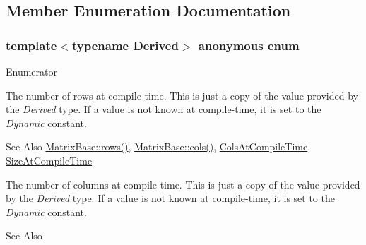 \subsection{Member Enumeration Documentation}
\hypertarget{class_sparse_matrix_base_af601f771c204b3ca254a52085525004c}{\subsubsection[{anonymous enum}]{\setlength{\rightskip}{0pt plus 5cm}template$<$typename Derived$>$ anonymous enum}}\label{class_sparse_matrix_base_af601f771c204b3ca254a52085525004c}
\begin{Desc}
\item[Enumerator]\par
\begin{description}
\item[{\em 
\hypertarget{class_sparse_matrix_base_af601f771c204b3ca254a52085525004ca6f1c32affc05e36001dd1643129f15a9}{Rows\-At\-Compile\-Time}\label{class_sparse_matrix_base_af601f771c204b3ca254a52085525004ca6f1c32affc05e36001dd1643129f15a9}
}]The number of rows at compile-\/time. This is just a copy of the value provided by the {\itshape Derived} type. If a value is not known at compile-\/time, it is set to the {\itshape Dynamic} constant. \begin{DoxySeeAlso}{See Also}
\hyperlink{class_matrix_base_ae82810ba95da637cdf434b4274083723}{Matrix\-Base\-::rows()}, \hyperlink{class_matrix_base_abe5381b539f87237647bc651a1ac0364}{Matrix\-Base\-::cols()}, \hyperlink{class_sparse_matrix_base_af601f771c204b3ca254a52085525004ca121f168f43ca4df38f99335271cad6e4}{Cols\-At\-Compile\-Time}, \hyperlink{class_sparse_matrix_base_af601f771c204b3ca254a52085525004cafc395f389ed423e885388eb180675329}{Size\-At\-Compile\-Time} 
\end{DoxySeeAlso}
\item[{\em 
\hypertarget{class_sparse_matrix_base_af601f771c204b3ca254a52085525004ca121f168f43ca4df38f99335271cad6e4}{Cols\-At\-Compile\-Time}\label{class_sparse_matrix_base_af601f771c204b3ca254a52085525004ca121f168f43ca4df38f99335271cad6e4}
}]The number of columns at compile-\/time. This is just a copy of the value provided by the {\itshape Derived} type. If a value is not known at compile-\/time, it is set to the {\itshape Dynamic} constant. \begin{DoxySeeAlso}{See Also}

\end{DoxySeeAlso}
\end{description}
\end{Desc}
